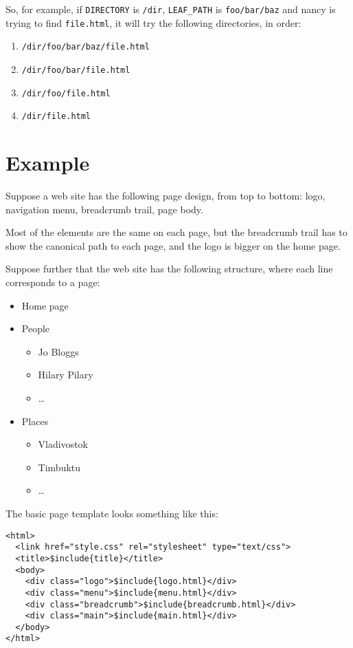 \documentclass[english]{scrartcl}
\begin{document}
So, for example, if \verb|DIRECTORY| is \verb|/dir|, \verb|LEAF_PATH| is \verb|foo/bar/baz| and nancy is trying to find \verb|file.html|, it will try the following directories, in order:

\begin{enumerate}
\item \verb|/dir/foo/bar/baz/file.html|
\item \verb|/dir/foo/bar/file.html|
\item \verb|/dir/foo/file.html|
\item \verb|/dir/file.html|
\end{enumerate}

\section{Example}

Suppose a web site has the following page design, from top to bottom: logo, navigation menu, breadcrumb trail, page body.

Most of the elements are the same on each page, but the breadcrumb trail has to show the canonical path to each page, and the logo is bigger on the home page.

Suppose further that the web site has the following structure, where each line corresponds to a page:

\begin{itemize}
\item Home page
\item People
  \begin{itemize}
  \item Jo Bloggs
  \item Hilary Pilary
  \item \dots
  \end{itemize}
\item Places
  \begin{itemize}
  \item Vladivostok
  \item Timbuktu
  \item \dots
  \end{itemize}
\end{itemize}

The basic page template looks something like this:

\begin{verbatim}
<html>
  <link href="style.css" rel="stylesheet" type="text/css">
  <title>$include{title}</title>
  <body>
    <div class="logo">$include{logo.html}</div>
    <div class="menu">$include{menu.html}</div>
    <div class="breadcrumb">$include{breadcrumb.html}</div>
    <div class="main">$include{main.html}</div>
  </body>
</html>
\end{verbatim}
\end{document}
